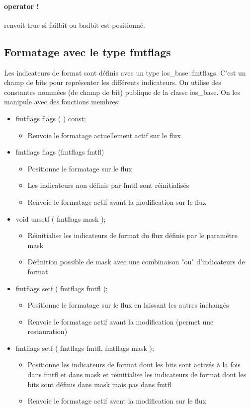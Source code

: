 \documentclass[10pt,a4paper,twoside]{article}
\begin{document}
\paragraph{operator !} renvoit true si failbit ou badbit est positionné.

\subsection{Formatage avec le type fmtflags}
Les indicateurs de format sont définis avec un type ios\_base::fmtflags. C'est un champ de bits pour représenter les différents indicateurs. On utilise des constantes nommées (de champ de bit) publique de la classe ios\_base. On les manipule avec des fonctions membres:
\begin{itemize}
\item fmtflags flags ( ) const;
\begin{itemize}
\item Renvoie le formatage actuellement actif sur le flux
\end{itemize}
\item fmtflags flags (fmtflags fmtfl)
\begin{itemize}
\item Positionne le formatage sur le flux
\item Les indicateurs non définis par fmtfl sont réinitialisés
\item Renvoie le formatage actif avant la modification sur le flux
\end{itemize}
\item void unsetf ( fmtflags mask );
\begin{itemize}
\item Réinitialise les indicateurs de format du flux définis par le paramètre mask
\item Définition possible de mask avec une combinaison "ou" d'indicateurs de format
\end{itemize}
\item fmtflags setf ( fmtflags fmtfl );
\begin{itemize}
\item Positionne le formatage sur le flux en laissant les autres inchangés
\item Renvoie le formatage actif avant la modification (permet une restauration)
\end{itemize}
\item fmtflags setf ( fmtflags fmtfl, fmtflags mask );
\begin{itemize}
\item Positionne les indicateurs de format dont les bits sont activés à la fois dans fmtfl et dans mask et réinitialise les indicateurs de format dont les bits sont définis dans mask mais pas dans fmtfl
\item Renvoie le formatage actif avent la modification sur le flux
\end{itemize}
\end{itemize}
\end{document}
